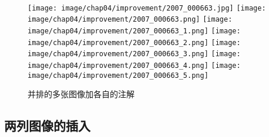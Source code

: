 \begin{figure}[h]
    \centering
    \enspace
    \enspace
    \enspace\thinspace
    \enspace\thinspace
    \enspace\thinspace
    \enspace\thinspace
    \\
    \texttt{[image: image/chap04/improvement/2007\_000663.jpg]}
    \enspace\thinspace %
    \texttt{[image: image/chap04/improvement/2007\_000663.png]}
    \enspace\thinspace
    \texttt{[image: image/chap04/improvement/2007\_000663\_1.png]}
    \enspace\thinspace
    \texttt{[image: image/chap04/improvement/2007\_000663\_2.png]}
    \enspace\thinspace
    \texttt{[image: image/chap04/improvement/2007\_000663\_3.png]}
    \enspace\thinspace
    \texttt{[image: image/chap04/improvement/2007\_000663\_4.png]}
    \enspace\thinspace
    \texttt{[image: image/chap04/improvement/2007\_000663\_5.png]}
    \enspace\thinspace
    \caption{并排的多张图像加各自的注解}
    \label{fig:improvement}
\end{figure}


\subsection{两列图像的插入}

